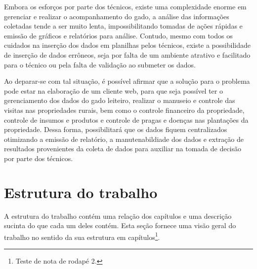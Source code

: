 Embora os esforços por parte dos técnicos, existe uma complexidade enorme em gerenciar e realizar o acompanhamento do gado, a análise das informações coletadas tende a ser muito lenta, impossibilitando tomadas de ações rápidas e emissão de gráficos e relatórios para análise. Contudo, mesmo com todos os cuidados na inserção dos dados em planilhas pelos técnicos, existe a possibilidade de inserção de dados errôneos, seja por falta de um ambiente atrativo e facilitado para o técnico ou pela falta de validação ao submeter os dados.

Ao deparar-se com tal situação, é possível afirmar que a solução para o problema pode estar na elaboração de um cliente web, para que seja possível ter o gerenciamento dos dados do gado leiteiro, realizar o manuseio e controle das visitas nas propriedades rurais, bem como o controle financeiro da propriedade, controle de insumos e produtos e controle de pragas e doenças nas plantações da propriedade. Dessa forma, possibilitará que os dados fiquem centralizados otimizando a emissão de relatório, a manutenabildiade dos dados e extração de resultados provenientes da coleta de dados para auxiliar na tomada de decisão por parte dos técnicos.


\section{Estrutura do trabalho}\label{sec:estruturaTrabalho}

A estrutura do trabalho contém uma relação dos capítulos e uma descrição sucinta do que cada um deles contém. Esta seção fornece uma visão geral do trabalho no sentido da sua estrutura em capítulos\footnote{Teste de nota de rodapé 2.}.

